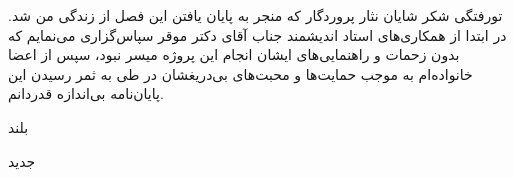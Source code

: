 


\pagestyle{empty}


‌تورفتگی شکر شایان نثار پروردگار که منجر به پایان یافتن این فصل از زندگی من شد. در ابتدا از همکاری‌های استاد اندیشمند جناب آقای دکتر موقر سپاس‌گزاری می‌نمایم که بدون زحمات و راهنمایی‌های ایشان انجام این پروژه میسر نبود،  سپس از اعضا خانواده‌ام به موجب حمایت‌ها و محبت‌های بی‌دریغشان‌ در طی به ثمر رسیدن این پایان‌نامه بی‌اندازه قدردانم. 





‌بلند

‌جدید

